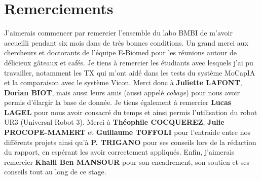 \chapter*{Remerciements}

  J'aimerais commencer par remercier l'ensemble du labo BMBI de m'avoir accueilli pendant six mois dans de très bonnes conditions. Un grand merci aux chercheurs et doctorants de l'équipe E-Biomed pour les réunions autour de délicieux gâteaux et cafés. Je tiens à remercier les étudiants avec lesquels j'ai pu travailler, notamment les TX qui m'ont aidé dans les tests du système MoCapIA et la comparaison avec le système Vicon. Merci donc à \textbf{Juliette LAFONT}, \textbf{Dorian BIOT}, mais aussi leurs amis (aussi appelé \textit{cobaye}) pour nous avoir permis d'élargir la base de donnée. Je tiens également à remercier \textbf{Lucas LAGEL} pour nous avoir consacré du temps et ainsi permis l'utilisation du robot UR3 (Universal Robot 3). Merci à \textbf{Théophile COCQUEREZ}, \textbf{Julie PROCOPE-MAMERT} et \textbf{Guillaume TOFFOLI} pour l'entraide entre nos différents projets ainsi qu'à \textbf{P. TRIGANO} pour ses conseils lors de la rédaction du rapport, en espérant les avoir correctement appliqués. Enfin, j'aimerais remercier \textbf{Khalil Ben MANSOUR} pour son encadrement, son soutien et ses conseils tout au long de ce stage.


